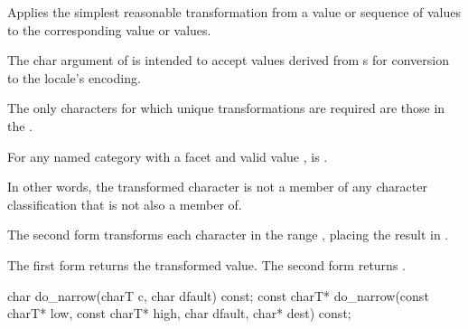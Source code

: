\begin{itemdescr}
\pnum
\effects
Applies the simplest reasonable transformation
from a  value or sequence of  values
to the corresponding  value or values.
\begin{footnote}
The char argument of  is intended to
accept values derived from s
for conversion to the locale's encoding.
\end{footnote}
The only characters for which unique transformations are required
are those in the .

For any named  category with
a  facet  and
valid  value ,
 is .
\begin{footnote}
In other words, the transformed character is not
a member of any character classification
that  is not also a member of.
\end{footnote}

The second form transforms
each character  in the range ,
placing the result in .

\pnum
\returns
The first form returns the transformed value.
The second form returns .
\end{itemdescr}

%
\begin{itemdecl}
char         do_narrow(charT c, char dfault) const;
const charT* do_narrow(const charT* low, const charT* high, char dfault, char* dest) const;
\end{itemdecl}

